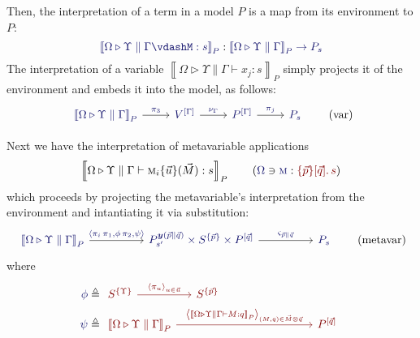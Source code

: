 \documentclass[11pt]{article}
\theoremstyle{definition}
\theoremstyle{remark}
\numberwithin{equation}{section}
\def\IModeColorName{MidnightBlue}
\def\OModeColorName{Maroon}
\newcommand\IMode[1]{{\color{\IModeColorName}{#1}}}
\newcommand\OMode[1]{{\color{\OModeColorName}{#1}}}
\newcommand\Of[2]{\IMode{#1}: \IMode{#2}}
\newcommand\MkValence[3]{%
  \ifthenelse{\equal{#1}{}}{}{%
    \{#1\}%
  }%
  \ifthenelse{\equal{#2}{}}{}{%
    [#2]%
  }.\, #3%
}
\newcommand\Lookup[3]{\IMode{#1}\ni\IMode{#2}:\OMode{#3}}
\newcommand\Tuple[1]{\left\langle#1 \right\rangle}
\newcommand\MV[1]{\textsc{#1}}
\newcommand\MApp[3]{#1\{#2\}(#3)}
\newcommand\ADefine[2]{\IMode{#1}&\triangleq\OMode{#2}}
\newcommand\SemBrackets[1]{\left\llbracket#1\right\rrbracket}
\newcommand\Yoneda[1]{\boldsymbol{y} (#1)}
\begin{document}
Then, the interpretation of a term in a model $P$ is a map from its environment
to $P$:
\[%
  \Of{\SemBrackets{\Omega\triangleright\Upsilon\parallel\Gamma\vdash%
      M:s}_P}{\SemBrackets{\Omega\triangleright\Upsilon\parallel\Gamma}_P\to P_s}%
\]%
The interpretation of a variable
$\SemBrackets{\Omega\triangleright\Upsilon\parallel\Gamma\vdash x_j:s}_P$ simply
projects it of the environment and embeds it into the model, as follows:
\[
  \begin{tikzcd}[ampersand replacement = \&]
    {\IMode{\SemBrackets{\Omega\triangleright\Upsilon\parallel\Gamma}_P}} \arrow[r, "\IMode{\pi_3}"]
    \& {\IMode{V^{[\Gamma]}}} \arrow[r, "\IMode{\nu_{\Gamma}}"]
    \& {\IMode{P^{[\Gamma]}}} \arrow[r, "\IMode{\pi_j}"]
    \& \IMode{P_s}
  \end{tikzcd}
  \tag{var}
\]

Next we have the interpretation of metavariable applications
\[%
  \SemBrackets{\Omega\triangleright\Upsilon\parallel\Gamma\vdash%
    \MApp{\MV{m}_i}{\vec{u}}{\vec{M}} : s}_P%
  \qquad(\Lookup{\Omega}{\MV{m}}{\MkValence{\vec{p}}{\vec{q}}{s}})
\]
which proceeds by projecting the metavariable's interpretation from the
environment and intantiating it via substitution:
\[
  \begin{tikzcd}[ampersand replacement = \&, sep=huge]
    {\IMode{\SemBrackets{\Omega\triangleright\Upsilon\parallel\Gamma}_P}}
          \arrow[r, "\IMode{\Tuple{\pi_i\,\pi_1, \phi\,\pi_2, \psi}}"]
    \& {\IMode{P_{s'}^{\Yoneda{\vec{p}\parallel\vec{q}}}\times S^{\{\vec{p}\}} \times P^{[\vec{q}]}}}
          \arrow[r, "\IMode{\varsigma_{\vec{p}\parallel\vec{q}}}"]
    \& \IMode{P_s}
  \end{tikzcd}
  \tag{metavar}
\]
where
\begin{align*}
  \ADefine{\phi}{
  \begin{tikzcd}[ampersand replacement = \&, sep=huge]
    {S^{\{\Upsilon\}}} \arrow[r, "\Tuple{\pi_u}_{u\in\vec{u}}"]
    \& {S^{\{\vec{p}\}}}
  \end{tikzcd}
  }\\
  \ADefine{\psi}{
   \begin{tikzcd}[ampersand replacement = \&, sep=28ex]
     {\SemBrackets{\Omega\triangleright\Upsilon\parallel\Gamma}_P}
        \arrow[r, "\Tuple{\SemBrackets{\Omega\triangleright\Upsilon\parallel\Gamma\vdash M:q}_P}_{(M,q)\in \vec{M}\otimes\vec{q}}"]
     \& {P^{[\vec{q}]}}
   \end{tikzcd}
  }
\end{align*}
\end{document}
